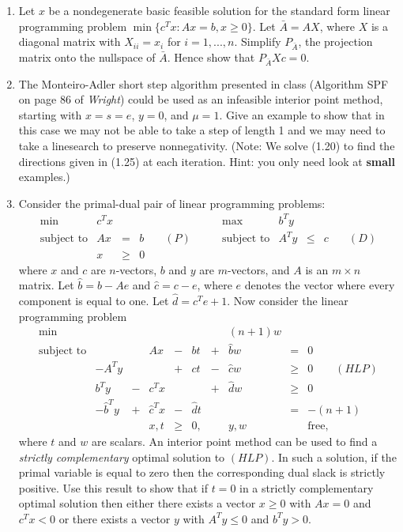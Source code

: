 \documentclass[12pt]{article}
\begin{document}
\begin{enumerate}
  \item  Let $x$ be a nondegenerate basic feasible solution for the standard
    form linear programming problem $\min\{c^Tx:Ax=b, x\geq 0 \}$.
    Let $\bar{A} = AX$, where $X$ is a diagonal matrix with $X_{ii}=x_i$ for
    $i=1,...,n$. Simplify $P_{\bar{A}}$, the projection matrix onto the
    nullspace of $\bar{A}$.
    Hence show that $P_{\bar{A}} Xc = 0$.
  \item  \label{MAd1}
The Monteiro-Adler short step algorithm presented in class (Algorithm SPF
on page 86 of {\em Wright}) could be used as an infeasible interior point
method, starting with $x=s=e$, $y=0$, and $\mu=1$.
Give an example to show that in this case we may not be able
to take a step of length 1 and we may need to take a linesearch to
preserve nonnegativity.
(Note: We solve (1.20) to find the directions given in (1.25)
at each iteration. Hint: you only need look at {\bf small} examples.)
  \item
Consider the primal-dual pair of linear programming problems:
\begin{displaymath}
\begin{array}{lrclllrcll}
\min & c^Tx &&&& \max & b^Ty \\
\mbox{subject to} & Ax & = & b & \quad (P) \qquad &
   \mbox{subject to} & A^Ty & \leq & c  & \quad (D)  \\
& x & \geq & 0
\end{array}
\end{displaymath}
where $x$ and $c$ are $n$-vectors, $b$ and $y$ are $m$-vectors,
and $A$ is an $m \times n$ matrix.
Let $\hat{b}=b-Ae$ and $\hat{c}=c-e$,
where $e$ denotes the vector where every component is equal to one.
Let $\hat{d}=c^Te+1$.
Now consider the linear programming problem
\begin{displaymath}
\begin{array}{lrcrcrcccl}
\min &&&&&&& (n+1) w \\
\mbox{subject to} &&& Ax & - & bt & + & \hat{b} w & = & 0  \\
& -A^Ty &&& + & ct & - & \hat{c} w & \geq & 0 \qquad (HLP)  \\
& b^Ty & - & c^T x &&& + & \hat{d} w & \geq & 0 \\
& -\hat{b}^Ty & + & \hat{c}^Tx & - & \hat{d} t &&& = & -(n+1)  \\
&&& x,t & \geq & 0, && y,w &&\mbox{free,}
\end{array}
\end{displaymath}
where $t$ and $w$ are scalars.
An interior point method can be used to find a {\em strictly complementary}
optimal solution to $(HLP)$.
In such a solution, if the primal variable is equal to zero then
the corresponding dual slack is strictly positive.
Use this result to show that if $t=0$ in a strictly complementary
optimal solution then either there exists a vector $x\geq 0$ with $Ax=0$ and
$c^Tx<0$ or there exists a vector $y$ with $A^Ty\leq 0$ and $b^Ty>0$.
\end{enumerate}
\end{document}
